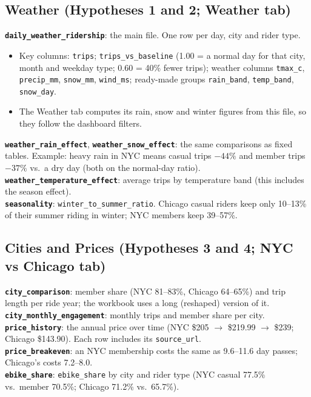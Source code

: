 \documentclass[11pt,a4paper]{article}
\newcommand{\f}[1]{\texttt{\small #1}}
\begin{document}
\subsection{Weather (Hypotheses 1 and 2; Weather tab)}
\textbf{\f{daily\_weather\_ridership}}: the main file. One row per day, city and rider type.
\begin{itemize}
\item Key columns: \f{trips}; \f{trips\_vs\_baseline} (1.00 = a normal day for that city, month and weekday type; 0.60 = 40\% fewer trips); weather columns \f{tmax\_c}, \f{precip\_mm}, \f{snow\_mm}, \f{wind\_ms}; ready-made groups \f{rain\_band}, \f{temp\_band}, \f{snow\_day}.
\item The Weather tab computes its rain, snow and winter figures from this file, so they follow the dashboard filters.
\end{itemize}
\textbf{\f{weather\_rain\_effect}}, \textbf{\f{weather\_snow\_effect}}: the same comparisons as fixed tables. Example: heavy rain in NYC means casual trips $-44\%$ and member trips $-37\%$ vs.\ a dry day (both on the normal-day ratio).\\
\textbf{\f{weather\_temperature\_effect}}: average trips by temperature band (this includes the season effect).\\
\textbf{\f{seasonality}}: \f{winter\_to\_summer\_ratio}. Chicago casual riders keep only 10--13\% of their summer riding in winter; NYC members keep 39--57\%.

\subsection{Cities and Prices (Hypotheses 3 and 4; NYC vs Chicago tab)}
\textbf{\f{city\_comparison}}: member share (NYC 81--83\%, Chicago 64--65\%) and trip length per ride year; the workbook uses a long (reshaped) version of it.\\
\textbf{\f{city\_monthly\_engagement}}: monthly trips and member share per city.\\
\textbf{\f{price\_history}}: the annual price over time (NYC \$205 $\rightarrow$ \$219.99 $\rightarrow$ \$239; Chicago \$143.90). Each row includes its \f{source\_url}.\\
\textbf{\f{price\_breakeven}}: an NYC membership costs the same as 9.6--11.6 day passes; Chicago's costs 7.2--8.0.\\
\textbf{\f{ebike\_share}}: \f{ebike\_share} by city and rider type (NYC casual 77.5\% vs.\ member 70.5\%; Chicago 71.2\% vs.\ 65.7\%).
\end{document}
